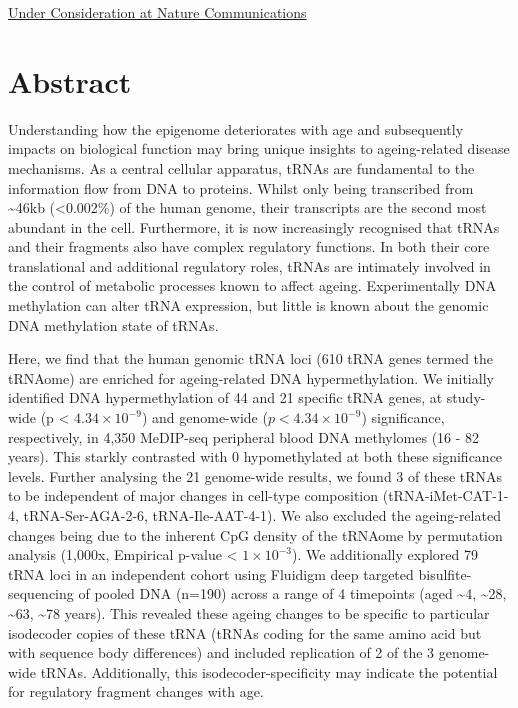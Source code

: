\documentclass[]{book}
\begin{document}
\href{https://nature-research-under-consideration.nature.com/users/37265-nature-communications/posts/57741-the-genomic-loci-of-specific-human-trna-genes-exhibit-ageing-related-dna-hypermethylation}{Under Consideration at Nature Communications}

\newpage

\hypertarget{abstract-2}{%
\section{Abstract}\label{abstract-2}}

Understanding how the epigenome deteriorates with age and subsequently impacts on biological function may bring unique insights to ageing-related disease mechanisms. As a central cellular apparatus, tRNAs are fundamental to the information flow from DNA to proteins.
Whilst only being transcribed from \textasciitilde46kb (\textless0.002\%) of the human genome, their transcripts are the second most abundant in the cell.
Furthermore, it is now increasingly recognised that tRNAs and their fragments also have complex regulatory functions.
In both their core translational and additional regulatory roles, tRNAs are intimately involved in the control of metabolic processes known to affect ageing.
Experimentally DNA methylation can alter tRNA expression, but little is known about the genomic DNA methylation state of tRNAs.

Here, we find that the human genomic tRNA loci (610 tRNA genes termed the tRNAome) are enriched for ageing-related DNA hypermethylation.
We initially identified DNA hypermethylation of 44 and 21 specific tRNA genes, at study-wide (p \textless{} \(4.34\times10^{-9}\)) and genome-wide (\(p < 4.34\times10^{-9}\)) significance, respectively, in 4,350 MeDIP-seq peripheral blood DNA methylomes (16 - 82 years).
This starkly contrasted with 0 hypomethylated at both these significance levels.
Further analysing the 21 genome-wide results, we found 3 of these tRNAs to be independent of major changes in cell-type composition (tRNA-iMet-CAT-1-4, tRNA-Ser-AGA-2-6, tRNA-Ile-AAT-4-1).
We also excluded the ageing-related changes being due to the inherent CpG density of the tRNAome by permutation analysis (1,000x, Empirical p-value \textless{} \(1\times10^{-3}\)).
We additionally explored 79 tRNA loci in an independent cohort using Fluidigm deep targeted bisulfite-sequencing of pooled DNA (n=190) across a range of 4 timepoints (aged \textasciitilde4, \textasciitilde28, \textasciitilde63, \textasciitilde78 years).
This revealed these ageing changes to be specific to particular isodecoder copies of these tRNA (tRNAs coding for the same amino acid but with sequence body differences) and included replication of 2 of the 3 genome-wide tRNAs.
Additionally, this isodecoder-specificity may indicate the potential for regulatory fragment changes with age.
\end{document}
